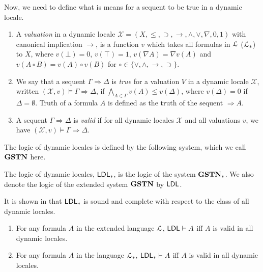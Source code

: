   Now, we need to define what is means for a sequent to be true in a dynamic locale.
  \begin{dfn}\quad
    \begin{enumerate}
      \item A \emph{valuation} in a dynamic locale $\mathcal{X} = (X, \le, \supset, \rightarrow, \wedge, \vee, \nabla, 0, 1)$ with canonical implication $\rightarrow$, is a function $v$ which takes all formulas in $\mathcal{L}$ ($\mathcal{L}_*$) to $X$, where $v(\bot) = 0$, $v(\top) = 1$, $v(\nabla A) = \nabla v(A)$ and  $v(A \circ B) = v(A) \circ v(B)$ for $\circ \in \{\vee, \wedge, \rightarrow, \supset\}$.
      \item We say that a sequent $\Gamma \Rightarrow \Delta$ is \emph{true} for a valuation $V$ in a dynamic locale $\mathcal{X}$, written $(\mathcal{X}, v) \vDash \Gamma \Rightarrow \Delta$, if $\bigwedge_{A \in \Gamma} v(A) \le v(\Delta)$, where $v(\Delta) = 0$ if $\Delta = \emptyset$. Truth of a formula $A$ is defined as the truth of the sequent $\Rightarrow A$.
      \item A sequent $\Gamma \Rightarrow \Delta$ is \emph{valid} if for all dynamic locales $\mathcal{X}$ and all valuations $v$, we have $(\mathcal{X}, v) \vDash \Gamma \Rightarrow \Delta$.
    \end{enumerate}
  \end{dfn}
  
  The logic of dynamic locales is defined by the following system, which we call $\mathbf{GSTN}$ here.
  
  \vspace*{1cm}

  The logic of dynamic locales, $\mathsf{LDL}_*$, is the logic of the system $\mathbf{GSTN}_*$. We also denote the logic of the extended system $\mathbf{GSTN}$ by $\mathsf{LDL}$.
  
  It is shown in \cite{amir} that $\mathsf{LDL}_*$ is sound and complete with respect to the class of all dynamic locales.
  \begin{thm} \quad
    \begin{enumerate}
      \item For any formula $A$ in the extended language $\mathcal{L}$, $\mathsf{LDL} \vdash A$ iff $A$ is valid in all dynamic locales.
      \item For any formula $A$ in the language $\mathcal{L}_*$, $\mathsf{LDL}_* \vdash A$ iff $A$ is valid in all dynamic locales.
    \end{enumerate}
  \end{thm}
  